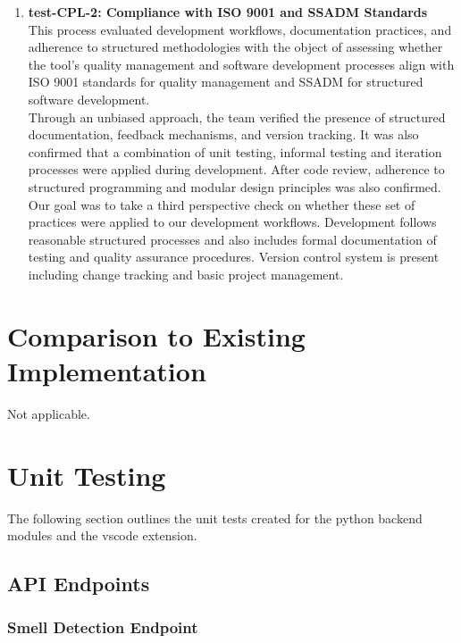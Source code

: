 \documentclass[12pt, titlepage]{article}
\begin{document}
\begin{enumerate}
  \item \textbf{test-CPL-2: Compliance with ISO 9001 and SSADM
    Standards} \\[2mm]
    This process evaluated development workflows, documentation
    practices, and adherence to structured methodologies with the
    object of assessing whether the tool’s quality management and
    software development processes align with ISO 9001 standards for
    quality management and SSADM for structured software development.\\
    \noindent Through an unbiased approach, the team verified the
    presence of structured documentation, feedback mechanisms, and
    version tracking. It was also confirmed that a combination of
    unit testing, informal testing and iteration processes were
    applied during development. After code review, adherence to
    structured programming and modular design principles was also confirmed.
    \noindent Our goal was to take a third perspective check on
    whether these set of practices were applied to our development
    workflows. Development follows reasonable structured processes
    and also includes formal documentation of testing and quality
    assurance procedures. Version control system is present including
    change tracking and basic project management.

\end{enumerate}

\section{Comparison to Existing Implementation}

Not applicable.

\section{Unit Testing}

The following section outlines the unit tests created for the python
backend modules and the vscode extension.

\newcommand{\testcount}{\stepcounter{testcase}\thetestcase}
\renewcommand{\arraystretch}{1.2} %

\subsection{API Endpoints}

\subsubsection{Smell Detection Endpoint}
\end{document}
